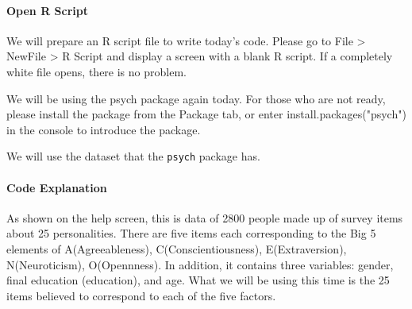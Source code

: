 \documentclass{ltjsbook}
\begin{document}
\paragraph{Open R Script} We will prepare an R script file to write today's code. Please go to File > NewFile > R Script and display a screen with a blank R script. If a completely white file opens, there is no problem.

We will be using the psych package again today. For those who are not ready, please install the package from the Package tab, or enter install.packages("psych") in the console to introduce the package.

We will use the dataset that the \texttt{psych} package has.


\paragraph{Code Explanation}


As shown on the help screen, this is data of 2800 people made up of survey items about 25 personalities. There are five items each corresponding to the Big 5 elements of A(Agreeableness), C(Conscientiousness), E(Extraversion), N(Neuroticism), O(Opennness). In addition, it contains three variables: gender, final education (education), and age. What we will be using this time is the 25 items believed to correspond to each of the five factors.


\end{document}
